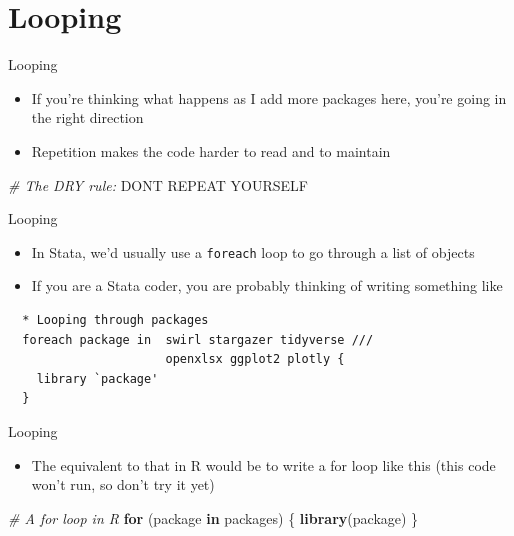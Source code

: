 \documentclass[ignorenonframetext,]{beamer}
\newenvironment{Shaded}{\begin{snugshade}}{\end{snugshade}}
\newcommand{\KeywordTok}[1]{\textcolor[rgb]{0.13,0.29,0.53}{\textbf{#1}}}
\newcommand{\CommentTok}[1]{\textcolor[rgb]{0.56,0.35,0.01}{\textit{#1}}}
\newcommand{\ControlFlowTok}[1]{\textcolor[rgb]{0.13,0.29,0.53}{\textbf{#1}}}
\newcommand{\NormalTok}[1]{#1}
\providecommand{\tightlist}{%
  \setlength{\itemsep}{0pt}\setlength{\parskip}{0pt}}
\begin{document}
\section{Looping}\label{looping}

\begin{frame}[fragile]{Looping}

\begin{itemize}
\tightlist
\item
  If you're thinking what happens as I add more packages here, you're
  going in the right direction
\item
  Repetition makes the code harder to read and to maintain
\end{itemize}

\begin{Shaded}
\begin{Highlighting}[]
    \CommentTok{# The DRY rule:}
\NormalTok{    DONT REPEAT YOURSELF}
\end{Highlighting}
\end{Shaded}

\end{frame}

\begin{frame}[fragile]{Looping}

\begin{itemize}
\tightlist
\item
  In Stata, we'd usually use a \texttt{foreach} loop to go through a
  list of objects
\item
  If you are a Stata coder, you are probably thinking of writing
  something like
\end{itemize}

\begin{verbatim}
  * Looping through packages
  foreach package in  swirl stargazer tidyverse ///
                      openxlsx ggplot2 plotly {
    library `package'
  }
\end{verbatim}

\end{frame}

\begin{frame}[fragile]{Looping}

\begin{itemize}
\tightlist
\item
  The equivalent to that in R would be to write a for loop like this
  (this code won't run, so don't try it yet)
\end{itemize}

\begin{Shaded}
\begin{Highlighting}[]
    \CommentTok{# A for loop in R}
    \ControlFlowTok{for}\NormalTok{ (package }\ControlFlowTok{in}\NormalTok{ packages) \{}
        \KeywordTok{library}\NormalTok{(package)}
\NormalTok{    \}}
\end{Highlighting}
\end{Shaded}

\end{frame}
\end{document}
